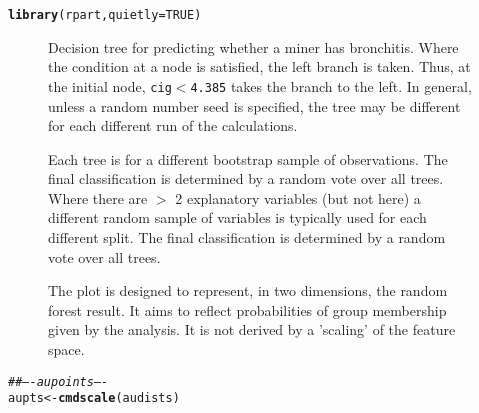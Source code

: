 \documentclass[12pt, a4paper,  BCOR=8.25mm, DIV=15]{scrartcl}\usepackage[]{graphicx}\usepackage[]{color}
\makeatletter
\newcommand{\hlnum}[1]{\textcolor[rgb]{0.686,0.059,0.569}{#1}}%
\newcommand{\hlcom}[1]{\textcolor[rgb]{0.678,0.584,0.686}{\textit{#1}}}%
\newcommand{\hlstd}[1]{\textcolor[rgb]{0.345,0.345,0.345}{#1}}%
\newcommand{\hlkwb}[1]{\textcolor[rgb]{0.69,0.353,0.396}{#1}}%
\newcommand{\hlkwc}[1]{\textcolor[rgb]{0.333,0.667,0.333}{#1}}%
\newcommand{\hlkwd}[1]{\textcolor[rgb]{0.737,0.353,0.396}{\textbf{#1}}}%
\newenvironment{kframe}{%
 \def\at@end@of@kframe{}%
 \ifinner\ifhmode%
  \def\at@end@of@kframe{\end{minipage}}%
  \begin{minipage}{\columnwidth}%
 \fi\fi%
 \def\FrameCommand##1{\hskip\@totalleftmargin \hskip-\fboxsep
 \colorbox{shadecolor}{##1}\hskip-\fboxsep
     \hskip-\linewidth \hskip-\@totalleftmargin \hskip\columnwidth}%
 \MakeFramed {\advance\hsize-\width
   \@totalleftmargin\z@ \linewidth\hsize
   \@setminipage}}%
 {\par\unskip\endMakeFramed%
 \at@end@of@kframe}
\newenvironment{knitrout}{}{} %
\newcommand{\txtt}[1]{{\texttt{#1}}}
\makeatother
\begin{document}
\begin{knitrout}
\color{fgcolor}\begin{kframe}
\begin{alltt}
\hlkwd{library}\hlstd{(rpart,} \hlkwc{quietly}\hlstd{=}\hlnum{TRUE}\hlstd{)}
\end{alltt}
\end{kframe}
\end{knitrout}

\begin{figure}

\caption{Decision tree for predicting whether a miner has
    bronchitis.  Where the condition at a node is satisfied, the left
    branch is taken. Thus, at the initial node, \txtt{cig$<$4.385}
    takes the branch to the left.  In general, unless a random number
    seed is specified, the tree may be different for each different run of the
    calculations.
}\label{fig:tree}
\end{figure}

\begin{figure}

\caption{Each tree is for a different bootstrap sample of
  observations.  The final classification is determined by a random
  vote over all trees.  Where there are $>$ 2 explanatory variables
  (but not here) a different random sample of variables is typically
  used for each different split. The final classification is
  determined by a random vote over all trees.}\label{fig:brontrees}
\end{figure}

\begin{figure}

\caption{The plot is designed to represent, in two dimensions, the random
  forest result. It aims to reflect probabilities of group membership
  given by the analysis.  It is not derived by a 'scaling' of the
  feature space.
}\label{fig:rfbronchit}
\end{figure}

\begin{knitrout}
\color{fgcolor}\begin{kframe}
\begin{alltt}
\hlcom{## ---- aupoints ----}
\hlstd{aupts} \hlkwb{<-} \hlkwd{cmdscale}\hlstd{(audists)}
\end{alltt}
\end{kframe}
\end{knitrout}
\end{document}
